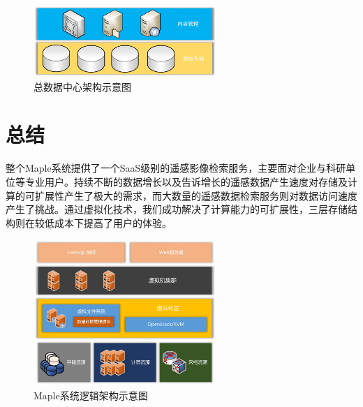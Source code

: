 \documentclass{article}
\begin{document}
\begin{figure}[H]
\centering 
\includegraphics[width=0.618\textwidth]{pic/all.jpg}
\caption{总数据中心架构示意图}
\label{all}
\end{figure}

\section{总结}
整个Maple系统提供了一个SaaS级别的遥感影像检索服务，主要面对企业与科研单位等专业用户。持续不断的数据增长以及告诉增长的遥感数据产生速度对存储及计算的可扩展性产生了极大的需求，而大数量的遥感数据检索服务则对数据访问速度产生了挑战。通过虚拟化技术，我们成功解决了计算能力的可扩展性，三层存储结构则在较低成本下提高了用户的体验。

\begin{figure}[H]
\centering 
\includegraphics[width=0.618\textwidth]{pic/logic.jpg}
\caption{Maple系统逻辑架构示意图}
\label{logic}
\end{figure}
\end{document}
